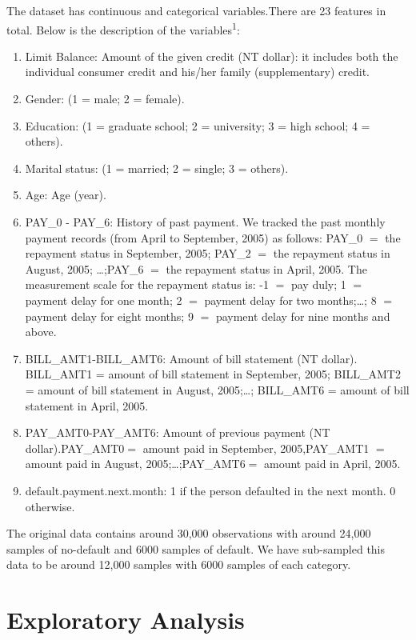 \documentclass{article}
\begin{document}
 
The dataset has continuous and categorical variables.There are 23 features in total. Below is the description of the variables\textsuperscript{1}:
\begin{enumerate}[leftmargin=2cm,rightmargin=2cm]
\item Limit Balance: Amount of the given credit (NT dollar): it includes both the individual consumer credit and his/her family (supplementary) credit.
\item Gender: (1 = male; 2 = female).
\item Education:  (1 = graduate school; 2 = university; 3 = high school; 4 = others).
\item Marital status:  (1 = married; 2 = single; 3 = others). 
\item Age: Age (year).
\item PAY\_0 - PAY\_6:  History of past payment. We tracked the past monthly payment records (from April to September, 2005) as follows: PAY\_0 $=$ the repayment status in September, 2005; PAY\_2 $=$ the repayment status in August, 2005; \ldots;PAY\_6 $=$ the repayment status in April, 2005. The measurement scale for the repayment status is: -1 $=$ pay duly; 1 $=$ payment delay for one month; 2 $=$ payment delay for two months;\ldots; 8 $=$ payment delay for eight months; 9 $=$ payment delay for nine months and above.
\item BILL\_AMT1-BILL\_AMT6: Amount of bill statement (NT dollar). BILL\_AMT1 = amount of bill statement in September, 2005; BILL\_AMT2 = amount of bill statement in August, 2005;\ldots; BILL\_AMT6 = amount of bill statement in April, 2005.
 \item PAY\_AMT0-PAY\_AMT6: Amount of previous payment (NT dollar).PAY\_AMT0$=$ amount paid in September, 2005,PAY\_AMT1 $=$ amount paid in August, 2005;\ldots;PAY\_AMT6$=$ amount paid in April, 2005.
\item default.payment.next.month: 1 if the person defaulted in the next month. 0 otherwise.

\end{enumerate}

\noindent The original data contains around 30,000 observations with around 24,000 samples of no-default and 6000 samples of default. We have sub-sampled this data to be around 12,000 samples with 6000 samples of each category.

\section{Exploratory Analysis}
\end{document}
